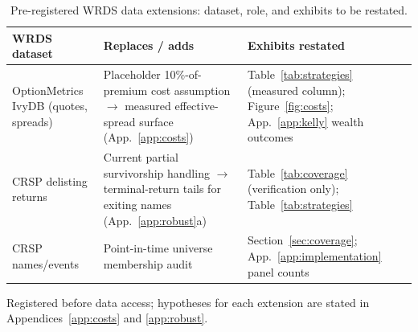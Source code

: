 \documentclass[11pt]{article}
\begin{document}
\begin{table}[h]
\centering
\begin{threeparttable}
\caption{Pre-registered WRDS data extensions: dataset, role, and exhibits to be restated.}
\label{tab:wrds}
\small
\begin{tabular}{p{}p{}p{}}
\toprule
WRDS dataset & Replaces / adds & Exhibits restated \\
\midrule
OptionMetrics IvyDB (quotes, spreads) & Placeholder 10\%-of-premium cost assumption $\to$ measured effective-spread surface (App.~\ref{app:costs}) & Table~\ref{tab:strategies} (measured column); Figure~\ref{fig:costs}; App.~\ref{app:kelly} wealth outcomes \\
CRSP delisting returns & Current partial survivorship handling $\to$ terminal-return tails for exiting names (App.~\ref{app:robust}a) & Table~\ref{tab:coverage} (verification only); Table~\ref{tab:strategies} \\
CRSP names/events & Point-in-time universe membership audit & Section~\ref{sec:coverage}; App.~\ref{app:implementation} panel counts \\
\bottomrule
\end{tabular}
\begin{tablenotes}\footnotesize
\item Registered before data access; hypotheses for each extension are stated in Appendices~\ref{app:costs} and \ref{app:robust}.
\end{tablenotes}
\end{threeparttable}
\end{table}
\end{document}
